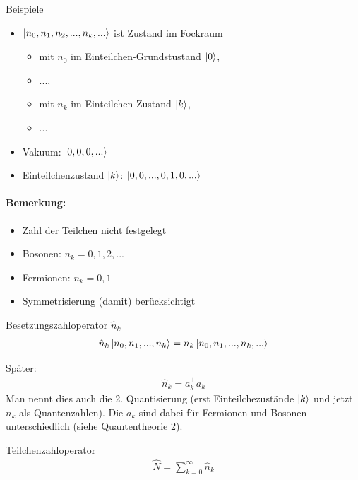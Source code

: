 \begin{beispiel}{Beispiele}
    \begin{itemize}
        \item $\ket{n_0,n_1,n_2,...,n_k,...}$ ist Zustand im Fockraum
        \begin{itemize}
            \item[] mit $n_0$ im Einteilchen-Grundstustand $\ket{0}$,
            \item[] ...,
            \item[] mit $n_k$ im Einteilchen-Zustand $\ket{k}$,
            \item[] ...
        \end{itemize}
        \item Vakuum: $\ket{0,0,0,...}$
        \item Einteilchenzustand $\ket{k}$: $\ket{0,0,...,0,1,0,...}$
    \end{itemize}
\end{beispiel}
\paragraph{Bemerkung:}
\begin{itemize}
    \item Zahl der Teilchen nicht festgelegt
    \item Bosonen: $n_k = 0,1,2,...$
    \item Fermionen: $n_k = 0,1$
    \item Symmetrisierung (damit) berücksichtigt
\end{itemize}



\begin{definition}{Besetzungszahloperator $\hat{n}_k$}
    \begin{align}
        \hat{n}_k \ket{n_0,n_1,...,n_k}= n_k \ket{n_0,n_1,...,n_k,...}
    \end{align}
\end{definition}
\color{black!40}
Später:
    \begin{align}
        \hat{n}_k = a_k^+a_k
    \end{align}
    Man nennt dies auch die 2. Quantisierung (erst Einteilchezustände $\ket{k}$ und jetzt $n_k$ als Quantenzahlen). Die $a_k$ sind dabei für Fermionen und Bosonen unterschiedlich (siehe Quantentheorie 2).
\color{black}

\begin{definition}{Teilchenzahloperator}
    \begin{align}
        \hat{N} = \sum_{k=0}^{\infty} \hat{n}_k
    \end{align}
\end{definition}

